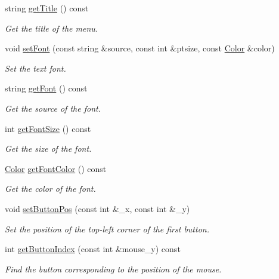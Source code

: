 \begin{DoxyCompactItemize}
string \mbox{\hyperlink{class_menu_ab7f3050f8f8083debec68f6f83575379}{get\+Title}} () const
\begin{DoxyCompactList}\small\item\em Get the title of the menu. \end{DoxyCompactList}\item 
void \mbox{\hyperlink{class_menu_ac8b1b161d1aa120db700d03c4b2c9617}{set\+Font}} (const string \&source, const int \&ptsize, const \mbox{\hyperlink{class_color}{Color}} \&color)
\begin{DoxyCompactList}\small\item\em Set the text font. \end{DoxyCompactList}\item 
string \mbox{\hyperlink{class_menu_abc1b901085908507509201656a68bc37}{get\+Font}} () const
\begin{DoxyCompactList}\small\item\em Get the source of the font. \end{DoxyCompactList}\item 
int \mbox{\hyperlink{class_menu_a0d1f7c0033afca099c71b35d3f5cf23f}{get\+Font\+Size}} () const
\begin{DoxyCompactList}\small\item\em Get the size of the font. \end{DoxyCompactList}\item 
\mbox{\hyperlink{class_color}{Color}} \mbox{\hyperlink{class_menu_ada3902ac8609448aa9c292d9082fabcf}{get\+Font\+Color}} () const
\begin{DoxyCompactList}\small\item\em Get the color of the font. \end{DoxyCompactList}\item 
void \mbox{\hyperlink{class_menu_a8363935442e9c88e1e613e3cd8824654}{set\+Button\+Pos}} (const int \&\+\_\+x, const int \&\+\_\+y)
\begin{DoxyCompactList}\small\item\em Set the position of the top-\/left corner of the first button. \end{DoxyCompactList}\item 
int \mbox{\hyperlink{class_menu_a83b3fc6786188f496f87658e099f2371}{get\+Button\+Index}} (const int \&mouse\+\_\+y) const
\begin{DoxyCompactList}\small\item\em Find the button corresponding to the position of the mouse. \end{DoxyCompactList}\item 

\end{DoxyCompactItemize}
